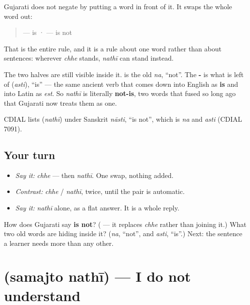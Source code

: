 \begin{cousinweb}
Gujarati does not negate \textbf{} by putting a word in front of it. It swaps the whole word out:

\begin{quote}
\textbf{} — is · \textbf{} — is not
\end{quote}

That is the entire rule, and it is a rule about one word rather than about sentences: wherever \emph{chhe} stands, \emph{nathī} can stand instead.

The two halves are still visible inside it. \textbf{} is the old \emph{na}, \textquotedblleft{}not\textquotedblright{}. The \textbf{-} is what is left of \textbf{} (\emph{asti}), \textquotedblleft{}is\textquotedblright{} — the same ancient verb that comes down into English as \textbf{is} and into Latin as \emph{est}. So \emph{nathī} is literally \textbf{not-is}, two words that fused so long ago that Gujarati now treats them as one.

CDIAL lists \textbf{} (\emph{nathī}) under Sanskrit \emph{nāsti}, \textquotedblleft{}is not\textquotedblright{}, which is \emph{na} and \emph{asti} (CDIAL 7091).
\end{cousinweb}

\subsection*{Your turn}
\begin{itemize}
\raggedright
  \item \emph{Say it:} \emph{chhe} — then \emph{nathī}. One swap, nothing added.
  \item \emph{Contrast:} \emph{chhe} / \emph{nathī}, twice, until the pair is automatic.
  \item \emph{Say it:} \emph{nathī} alone, as a flat answer. It is a whole reply.
\end{itemize}

\begin{tcolorbox}[breakable,colback=teal!4,colframe=teal!35!black,title={Before you move on}]
How does Gujarati say \textbf{is not}? (\textbf{} — it replaces \emph{chhe} rather than joining it.) What two old words are hiding inside it? (\emph{na}, \textquotedblleft{}not\textquotedblright{}, and \emph{asti}, \textquotedblleft{}is\textquotedblright{}.) Next: the sentence a learner needs more than any other.
\end{tcolorbox}
\section[\texorpdfstring{\gu{સમજતો} \gu{નથી} (samajto nathī)}{સમજતો નથી (samajto nathī)}]{  (samajto nathī) — I do not understand}


